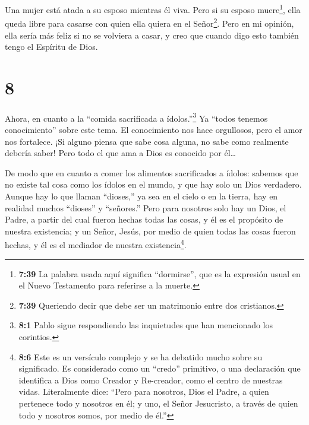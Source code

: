  Una mujer está atada a su esposo mientras él viva. Pero si
su esposo muere\footnote{\textbf{7:39} La palabra usada aquí significa
  ``dormirse'', que es la expresión usual en el Nuevo Testamento para
  referirse a la muerte.}, ella queda libre para casarse con quien ella
quiera en el Señor\footnote{\textbf{7:39} Queriendo decir que debe ser
  un matrimonio entre dos cristianos.}.  Pero en mi
opinión, ella sería más feliz si no se volviera a casar, y creo que
cuando digo esto también tengo el Espíritu de Dios.

\hypertarget{section-7}{%
\section{8}\label{section-7}}

 Ahora, en cuanto a la ``comida sacrificada a
ídolos.''\footnote{\textbf{8:1} Pablo sigue respondiendo las inquietudes
  que han mencionado los corintios.} Ya ``todos tenemos conocimiento''
sobre este tema. El conocimiento nos hace orgullosos, pero el amor nos
fortalece.  ¡Si alguno piensa que sabe cosa alguna, no sabe
como realmente debería saber!  Pero todo el que ama a Dios
es conocido por él\ldots{}

 De modo que en cuanto a comer los alimentos sacrificados a
ídolos: sabemos que no existe tal cosa como los ídolos en el mundo, y
que hay solo un Dios verdadero.  Aunque hay lo que llaman
``dioses,'' ya sea en el cielo o en la tierra, hay en realidad muchos
``dioses'' y ``señores.''  Pero para nosotros solo hay un
Dios, el Padre, a partir del cual fueron hechas todas las cosas, y él es
el propósito de nuestra existencia; y un Señor, Jesús, por medio de
quien todas las cosas fueron hechas, y él es el mediador de nuestra
existencia\footnote{\textbf{8:6} Este es un versículo complejo y se ha
  debatido mucho sobre su significado. Es considerado como un ``credo''
  primitivo, o una declaración que identifica a Dios como Creador y
  Re-creador, como el centro de nuestras vidas. Literalmente dice:
  ``Pero para nosotros, Dios el Padre, a quien pertenece todo y nosotros
  en él; y uno, el Señor Jesucristo, a través de quien todo y nosotros
  somos, por medio de él.''}.


